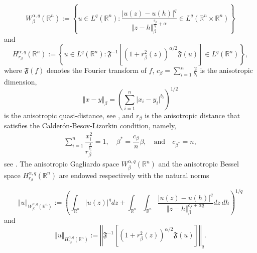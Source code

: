 \documentclass[10pt, leqno]{article}
\theoremstyle{definition}
\theoremstyle{remark}
\numberwithin{equation}{section}
\begin{document}
\begin{equation}
W_{\beta}^{\alpha, q}(\mathbb{R}^{n}) := \left  \lbrace u \in L^{q}(\mathbb{R}^{n}):   \displaystyle \dfrac{\vert u(z) - u(h) \vert^{q}}{\Vert z - h \Vert_{\beta}^{\frac{c_{\beta}}{q} + \alpha }} \in L^{q}\left( \mathbb{R}^{n} \times \mathbb{R}^{n} \right) \right \rbrace
\end{equation}
and
\begin{equation}
H_{r_{\beta}}^{\alpha, q}(\mathbb{R}^{n}) := \left  \lbrace u \in L^{q}(\mathbb{R}^{n}): \mathfrak{F}^{-1} \left[\left( 1 + r^{2}_{\beta}(z) \right)^{\alpha/2}  \mathfrak{F}(u) \right] \in L^{q}(\mathbb{R}^{n}) \right \rbrace,
\end{equation}
where $ \mathfrak{F}(f)$ denotes the Fourier transform of $f$, $c_{\beta} = \displaystyle \sum_{i=1}^{n} \frac{2}{b_{i}}$ is the anisotropic dimension,
$$
\Vert x - y \Vert_{\beta} = \left( \sum_{i=1}^{n} \vert x_{i} - y_{i} \vert^{b_{i}} \right)^{1/2}
$$
is the anisotropic quasi-distance, see \cite{CLU, LEITAO, SL}, and $r_{\beta}$ is the anisotropic distance that satisfies the Calder\' on-Besov-Lizorkin condition, namely,
\begin{eqnarray}
\label{CBL condition}
\sum_{i=1}^{n}\dfrac{x_{i}^{2}}{r_{\beta}^{\frac{4}{b^{\ast}_{i}}}} = 1, \quad \beta^{\ast} = \dfrac{c_{\beta} }{n}\beta, \quad \text{and} \quad c_{\beta^{\ast}} = n,
\end{eqnarray}
see \cite{BESOV-LIZORKIN}. The anisotropic Gagliardo space $W_{\beta}^{\alpha, q}(\mathbb{R}^{n})$ and the anisotropic Bessel space $H_{r_{\beta}}^{\alpha, q}(\mathbb{R}^{n})$ are endowed respectively with the natural norms

\begin{equation}
\Vert u \Vert_{W_{\beta}^{\alpha, q}(\mathbb{R}^{n})} := \left( \int_{\mathbb{R}^{n}} \vert u (z) \vert^{q} dz + \int_{\mathbb{R}^{n}} \int_{\mathbb{R}^{n}}  \dfrac{\vert u(z) - u(h) \vert^{q}}{\Vert z - h \Vert_{\beta}^{c_{\beta} + \alpha q}} dz \, dh \right)^{1/q}
\end{equation}
and
\begin{equation}
\Vert u \Vert_{H_{r_{\beta}}^{\alpha, q}(\mathbb{R}^{n})} := \left  \Vert \mathfrak{F}^{-1} \left[\left( 1 + r^{2}_{\beta}(z) \right)^{\alpha/2}  \mathfrak{F}(u) \right] \right \Vert_{q}.
\end{equation}
\end{document}
